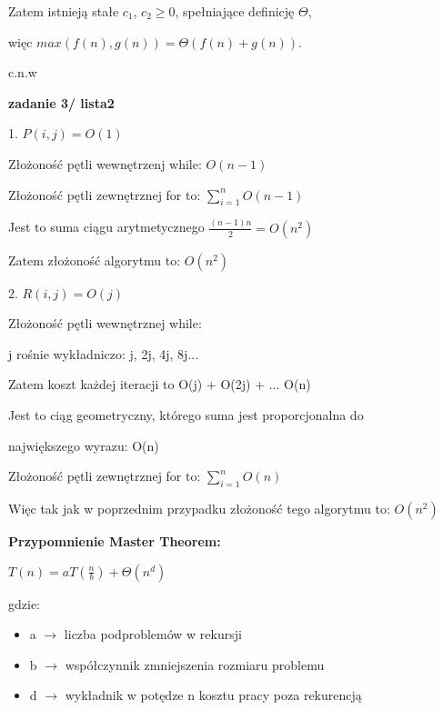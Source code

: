 \documentclass{article}
\begin{document}
    Zatem istnieją stałe $c_1$, $c_2 \geq 0$, spełniające definicję $\Theta$, \par
    więc $max(f(n), g(n)) = \Theta(f(n) + g(n))$. \par
    \par
    c.n.w \par
    \vspace{1\baselineskip}
    \textbf{zadanie 3/ lista2} \par
    1. $P(i, j) = O(1)$ \par
    Złożoność pętli wewnętrzenj while: $O(n - 1)$ \par
    Złożoność pętli zewnętrznej for to: $\sum_{i = 1}^{n} O(n-1)$ \par
    Jest to suma ciągu arytmetycznego $\frac{(n-1)n}{2} = O(n^2)$ \par
    Zatem złożoność algorytmu to: $O(n^2)$ \par
    \vspace{1\baselineskip}
    2. $R(i, j) = O(j)$ \par
    Złożoność pętli wewnętrznej while: \par
    j rośnie wykładniczo: j, 2j, 4j, 8j...\par
    Zatem koszt każdej iteracji to O(j) + O(2j) + ... O(n) \par
    Jest to ciąg geometryczny, którego suma jest proporcjonalna do  \par
    największego wyrazu: O(n) \par
    Złożoność pętli zewnętrznej for to: $\sum_{i = 1}^{n} O(n)$ \par
    Więc tak jak w poprzednim przypadku złożoność tego algorytmu to: $O(n^2)$ \par
    \vspace{1\baselineskip}
    \textbf{Przypomnienie Master Theorem:} \par
    \vspace{1\baselineskip}
    $T(n) = aT(\frac{n}{b}) + \Theta(n^d)$ \par
    gdzie: 
    \begin{itemize}
        \item a $\rightarrow$ liczba podproblemów w rekursji \par
        \item b $\rightarrow$ współczynnik zmniejszenia rozmiaru problemu \par
        \item d $\rightarrow$ wykładnik w potędze n kosztu pracy poza rekurencją \par
    \end{itemize} \par
\end{document}
